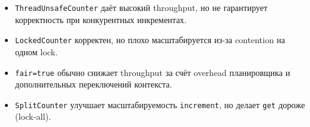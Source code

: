 \documentclass[a4paper,12pt]{article}
\begin{document}
\begin{itemize}
  \item \texttt{ThreadUnsafeCounter} даёт высокий throughput, но не гарантирует корректность при конкурентных инкрементах.
  \item \texttt{LockedCounter} корректен, но плохо масштабируется из-за contention на одном lock.
  \item \texttt{fair=true} обычно снижает throughput за счёт overhead планировщика и дополнительных переключений контекста.
  \item \texttt{SplitCounter} улучшает масштабируемость \texttt{increment}, но делает \texttt{get} дороже (lock-all).
\end{itemize}
\end{document}
